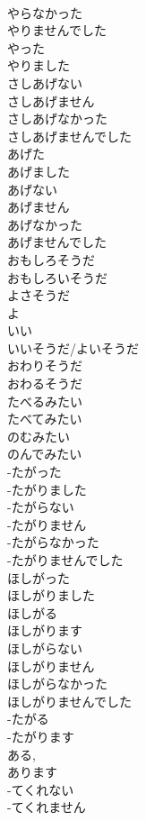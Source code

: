 \documentclass[8pt]{extreport}
\begin{document}
\begin{CJK}{UTF8}{min}
\\	やらなかった
\\	やりませんでした
\\	やった
\\	やりました
\\	さしあげない
\\	さしあげません
\\	さしあげなかった
\\	さしあげませんでした
\\	あげた
\\	あげました
\\	あげない
\\	あげません
\\	あげなかった
\\	あげませんでした
\\	おもしろそうだ			
\\	おもしろいそうだ			
\\	よさそうだ
\\	よ 
\\	いい 
\\	いいそうだ/よいそうだ			
\\	おわりそうだ			
\\	おわるそうだ			
\\	たべるみたい			
\\	たべてみたい			
\\	のむみたい			
\\	のんでみたい			
\\	-たがった
\\	-たがりました
\\	-たがらない
\\	-たがりません
\\	-たがらなかった
\\	-たがりませんでした
\\	ほしがった
\\	ほしがりました
\\	ほしがる
\\	ほしがります
\\	ほしがらない
\\	ほしがりません
\\	ほしがらなかった
\\	ほしがりませんでした
\\	-たがる
\\	-たがります
\\	ある, 
\\	あります	
\\	-てくれない
\\	-てくれません

\end{CJK}
\end{document}
